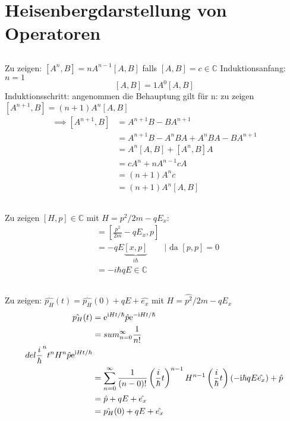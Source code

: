 \section{Heisenbergdarstellung von Operatoren}
\subsection{}
Zu zeigen:
$[A^n,B] = nA^{n-1}[A,B]$ falls $[A,B] = c \in \mathbb C$
Induktionsanfang: $n=1$
\[
    [A,B] = 1A^0[A,B]
\]
Induktionsschritt: angenommen die Behauptung gilt für n: zu zeigen $[A^{n+1},B] = (n+1)A^n[A,B]$
\begin{align*}
    \implies [A^{n+1},B] &= A^{n+1}B-BA^{n+1} \\
                         &= A^{n+1}B-A^nBA+A^nBA-BA^{n+1} \\
                         &= A^n[A,B]+[A^n,B]A \\
                         &= cA^n+nA^{n-1}cA \\
                         &= (n+1)A^nc \\
                         &= (n+1)A^n[A,B]
\end{align*}

\subsection{}
Zu zeigen $[H,p] \in\mathbb C$ mit $H = p^2/2m-qE_x$:
\begin{align*}
    [H,p] &= [\frac{p^2}{2m}-qE_x,p] \\
          &= -qE\underbrace{[x,p]}_{i\hbar} \qquad|\text{ da }[p,p]=0 \\
          &= -i\hbar qE \in\mathbb C
\end{align*}

\subsection{}
Zu zeigen: $\hat{p_H}(t) = \hat{p_H}(0)+qE+\hat{e_x}$ mit $H=\hat{p^2}/2m-qE_x$
\begin{align*}
    \hat{p_H}(t) &= \ee^{\ii Ht/\hbar}\hat{p}\ee^{-\ii Ht/\hbar} \\
                 &= sum^\infty_{n=0}\frac 1{n!}\\del{\frac i\hbar}^nt^nH^n\hat p\ee^{\ii Ht/\hbar} \\
                 &= \sum^\infty_{n=0} \frac 1{(n-0)!}\del{\frac i\hbar t}^{n-1}H^{n-1}\del{\frac i\hbar t}(-\ii\hbar qE\hat{e_x})+\hat p \\
                 &= \hat p + qE+\hat{e_x} \\
                 &=\hat{p_H}(0)+qE+\hat{e_x}
\end{align*}


    




